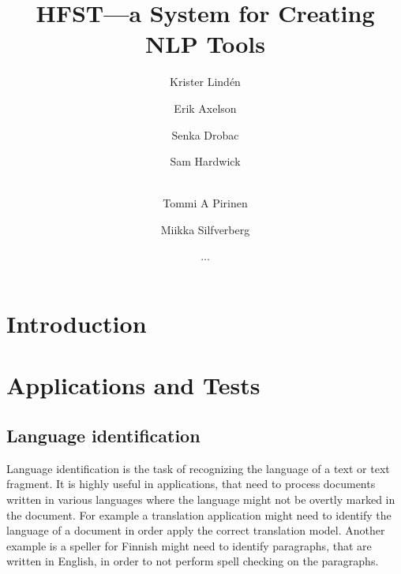 \documentclass{llncs}
\begin{document}
%
\title{HFST---a System for Creating NLP Tools}
%
\author{Krister Lind\'{e}n \and Erik Axelson \and Senka Drobac \and Sam Hardwick \and\\
Tommi A Pirinen \and Miikka Silfverberg \and ...}


\maketitle


\begin{abstract}
\end{abstract}


\section*{Introduction}

\section{Applications and Tests}\label{hfst:structural-layout}

\subsection{Language identification}
Language identification is the task of recognizing the language of a
text or text fragment. It is highly useful in applications, that need
to process documents written in various languages where the language
might not be overtly marked in the document. For example a translation
application might need to identify the language of a document in order
apply the correct translation model. Another example is a speller for
Finnish might need to identify paragraphs, that are written in
English, in order to not perform spell checking on the paragraphs.
\end{document}
